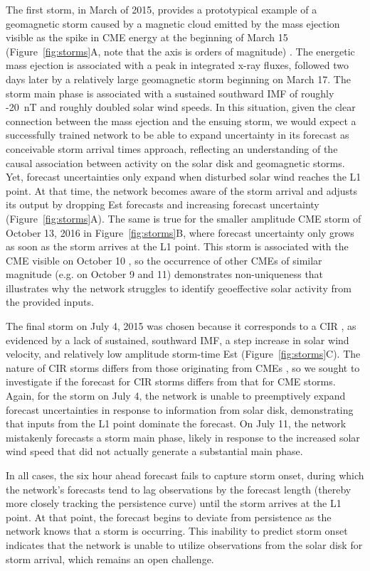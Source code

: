 The first storm, in March of 2015, provides a prototypical example of a geomagnetic storm caused by a magnetic cloud emitted by the mass ejection visible as the spike in CME energy at the beginning of March 15 (Figure~\ref{fig:storms}A, note that the axis is orders of magnitude) \citep{Patel2019}. The energetic mass ejection is associated with a peak in integrated x-ray fluxes, followed two days later by a relatively large geomagnetic storm beginning on March 17. The storm main phase is associated with a sustained southward IMF of roughly -20~nT and roughly doubled solar wind speeds. In this situation, given the clear connection between the mass ejection and the ensuing storm, we would expect a successfully trained network to be able to expand uncertainty in its forecast as conceivable storm arrival times approach, reflecting an understanding of the causal association between activity on the solar disk and geomagnetic storms. Yet, forecast uncertainties only expand when disturbed solar wind reaches the L1 point. At that time, the network becomes aware of the storm arrival and adjusts its output by dropping Est forecasts and increasing forecast uncertainty (Figure~\ref{fig:storms}A). The same is true for the smaller amplitude CME storm of October 13, 2016 in Figure~\ref{fig:storms}B, where forecast uncertainty only grows as soon as the storm arrives at the L1 point. This storm is associated with the CME visible on October 10 \citep{Patel2019}, so the occurrence of other CMEs of similar magnitude (e.g. on October 9 and 11) demonstrates non-uniqueness that illustrates why the network struggles to identify geoeffective solar activity from the provided inputs.

The final storm on July 4, 2015 was chosen because it corresponds to a CIR \citep{Shen2017}, as evidenced by a lack of sustained, southward IMF, a step increase in solar wind velocity, and relatively low amplitude storm-time Est (Figure~\ref{fig:storms}C). The nature of CIR storms differs from those originating from CMEs \citep{Zhang2007}, so we sought to investigate if the forecast for CIR storms differs from that for CME storms. Again, for the storm on July 4, the network is unable to preemptively expand forecast uncertainties in response to information from solar disk, demonstrating that inputs from the L1 point dominate the forecast. On July 11, the network mistakenly forecasts a storm main phase, likely in response to the increased solar wind speed that did not actually generate a substantial main phase.

In all cases, the six hour ahead forecast fails to capture storm onset, during which the network's forecasts tend to lag observations by the forecast length (thereby more closely tracking the persistence curve) until the storm arrives at the L1 point. At that point, the forecast begins to deviate from persistence as the network knows that a storm is occurring. This inability to predict storm onset indicates that the network is unable to utilize observations from the solar disk for storm arrival, which remains an open challenge. 

